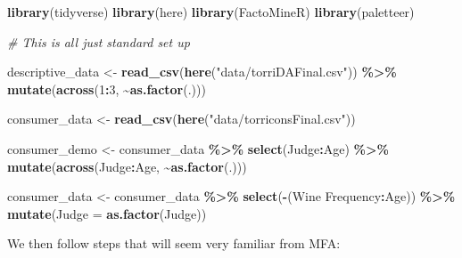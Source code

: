 \documentclass[
]{book}
\newenvironment{Shaded}{\begin{snugshade}}{\end{snugshade}}
\newcommand{\AttributeTok}[1]{\textcolor[rgb]{0.13,0.29,0.53}{#1}}
\newcommand{\CommentTok}[1]{\textcolor[rgb]{0.56,0.35,0.01}{\textit{#1}}}
\newcommand{\DecValTok}[1]{\textcolor[rgb]{0.00,0.00,0.81}{#1}}
\newcommand{\FunctionTok}[1]{\textcolor[rgb]{0.13,0.29,0.53}{\textbf{#1}}}
\newcommand{\NormalTok}[1]{#1}
\newcommand{\OtherTok}[1]{\textcolor[rgb]{0.56,0.35,0.01}{#1}}
\newcommand{\SpecialCharTok}[1]{\textcolor[rgb]{0.81,0.36,0.00}{\textbf{#1}}}
\newcommand{\StringTok}[1]{\textcolor[rgb]{0.31,0.60,0.02}{#1}}
\begin{document}
\begin{Shaded}
\begin{Highlighting}[]
\FunctionTok{library}\NormalTok{(tidyverse)}
\FunctionTok{library}\NormalTok{(here)}
\FunctionTok{library}\NormalTok{(FactoMineR)}
\FunctionTok{library}\NormalTok{(paletteer)}

\CommentTok{\# This is all just standard set up}

\NormalTok{descriptive\_data }\OtherTok{\textless{}{-}} 
  \FunctionTok{read\_csv}\NormalTok{(}\FunctionTok{here}\NormalTok{(}\StringTok{"data/torriDAFinal.csv"}\NormalTok{)) }\SpecialCharTok{\%\textgreater{}\%}
  \FunctionTok{mutate}\NormalTok{(}\FunctionTok{across}\NormalTok{(}\DecValTok{1}\SpecialCharTok{:}\DecValTok{3}\NormalTok{, }\SpecialCharTok{\textasciitilde{}}\FunctionTok{as.factor}\NormalTok{(.)))}

\NormalTok{consumer\_data }\OtherTok{\textless{}{-}} \FunctionTok{read\_csv}\NormalTok{(}\FunctionTok{here}\NormalTok{(}\StringTok{"data/torriconsFinal.csv"}\NormalTok{))}

\NormalTok{consumer\_demo }\OtherTok{\textless{}{-}} 
\NormalTok{  consumer\_data }\SpecialCharTok{\%\textgreater{}\%}
  \FunctionTok{select}\NormalTok{(Judge}\SpecialCharTok{:}\NormalTok{Age) }\SpecialCharTok{\%\textgreater{}\%}
  \FunctionTok{mutate}\NormalTok{(}\FunctionTok{across}\NormalTok{(Judge}\SpecialCharTok{:}\NormalTok{Age, }\SpecialCharTok{\textasciitilde{}}\FunctionTok{as.factor}\NormalTok{(.)))}

\NormalTok{consumer\_data }\OtherTok{\textless{}{-}} 
\NormalTok{  consumer\_data }\SpecialCharTok{\%\textgreater{}\%}
  \FunctionTok{select}\NormalTok{(}\SpecialCharTok{{-}}\NormalTok{(}\StringTok{\textasciigrave{}}\AttributeTok{Wine Frequency}\StringTok{\textasciigrave{}}\SpecialCharTok{:}\NormalTok{Age)) }\SpecialCharTok{\%\textgreater{}\%}
  \FunctionTok{mutate}\NormalTok{(}\AttributeTok{Judge =} \FunctionTok{as.factor}\NormalTok{(Judge))}
\end{Highlighting}
\end{Shaded}

We then follow steps that will seem very familiar from MFA:
\end{document}
